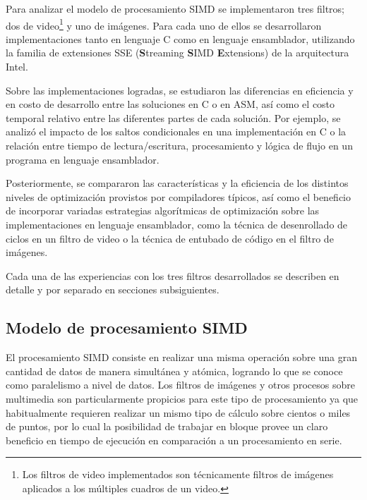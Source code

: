 

Para analizar el modelo de procesamiento SIMD se implementaron tres filtros; dos de video\footnote{Los filtros de video implementados son técnicamente filtros de imágenes aplicados a los múltiples cuadros de un video.} y uno de imágenes. Para cada uno de ellos se desarrollaron implementaciones tanto en lenguaje C como en lenguaje ensamblador, utilizando la familia de extensiones SSE (\textbf{S}treaming \textbf{S}IMD \textbf{E}xtensions) de la arquitectura Intel.

Sobre las implementaciones logradas, se estudiaron las diferencias en eficiencia y en costo de desarrollo entre las soluciones en C o en ASM, así como el costo temporal relativo entre las diferentes partes de cada solución. Por ejemplo, se analizó el impacto de los saltos condicionales en una implementación en C o la relación entre tiempo de lectura/escritura, procesamiento y lógica de flujo en un programa en lenguaje ensamblador.

Posteriormente, se compararon las características y la eficiencia de los distintos niveles de optimización provistos por compiladores típicos, así como el beneficio de incorporar variadas estrategias algorítmicas de optimización sobre las implementaciones en lenguaje ensamblador, como la técnica de desenrollado de ciclos en un filtro de video o la técnica de entubado de código en el filtro de imágenes.

Cada una de las experiencias con los tres filtros desarrollados se describen en detalle y por separado en secciones subsiguientes.

\subsection{Modelo de procesamiento SIMD}

El procesamiento SIMD consiste en realizar una misma operación sobre una gran cantidad de datos de manera simultánea y atómica, logrando lo que se conoce como paralelismo a nivel de datos. Los filtros de imágenes y otros procesos sobre multimedia son particularmente propicios para este tipo de procesamiento ya que habitualmente requieren realizar un mismo tipo de cálculo sobre cientos o miles de puntos, por lo cual la posibilidad de trabajar en bloque provee un claro beneficio en tiempo de ejecución en comparación a un procesamiento en serie.

